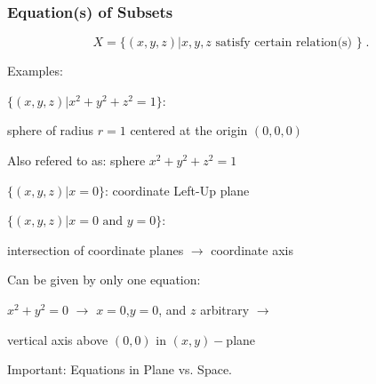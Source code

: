 \begin{frame}
 \frametitle{Equation(s) of Subsets}

  $$X = \{ (x,y,z) | x,y,z \text{ satisfy certain relation(s) } \} \; .$$

\pause
Examples:

$\{(x,y,z) | x^2+y^2+z^2 = 1\}$:

\pause
sphere of radius $r=1$ centered at the origin $(0,0,0)$

Also refered to as: sphere $x^2+y^2+z^2 = 1$

\pause
\medskip

$\{ (x,y,z) | x=0 \}$: coordinate Left-Up plane

\pause
\medskip

$\{ (x,y,z) | x=0 \text{ and } y=0 \}$:

intersection of coordinate planes $\rightarrow$ coordinate axis

\pause
\medskip

Can be given by only one equation:

$x^2+y^2 = 0$ $\rightarrow$ $x=0$,$y=0$, and $z$ arbitrary $\rightarrow$

vertical axis above $(0,0)$ in $(x,y)-$plane

\pause
\medskip

Important: Equations in Plane vs. Space.

\end{frame}